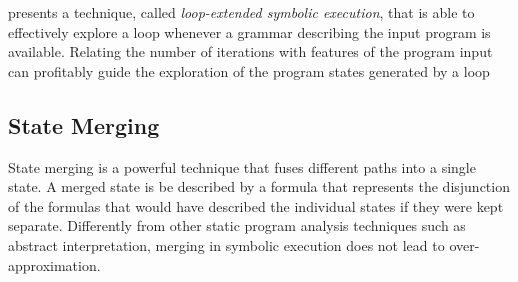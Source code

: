  presents a technique, called {\em loop-extended symbolic execution}, that is able to effectively explore a loop whenever a grammar describing the input program is available. Relating the number of iterations with features of the program input can profitably guide the exploration of the program states generated by a loop



\subsection{State Merging}

State merging is a powerful technique that fuses different paths into a single state. A merged state is be described by a formula that represents the disjunction of the formulas that would have described the individual states if they were kept separate. Differently from other static program analysis techniques such as abstract interpretation, merging in symbolic execution does not lead to over-approximation.


